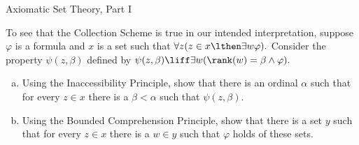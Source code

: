 \begin{unit}{Axiomatic Set Theory, Part I}
\begin{problem}
To see that the Collection Scheme is true in our intended interpretation, suppose \(\varphi\) is a formula and \(x\) is a set such that \(\forall z (z \in x \lthen \exists w \varphi).\)
Consider the property \(\psi(z,\beta)\) defined by \(\psi(z,\beta) \liff \exists w(\rank(w) = \beta \land \varphi).\)
\begin{enumerate}[(a)]
\item Using the Inaccessibility Principle, show that there is an ordinal \(\alpha\) such that for every \(z \in x\) there is a \(\beta < \alpha\) such that \(\psi(z,\beta).\)
\item Using the Bounded Comprehension Principle, show that there is a set \(y\) such that for every \(z \in x\) there is a \(w \in y\) such that \(\varphi\) holds of these sets.
\end{enumerate}
\end{problem}

\end{unit}
\endinput
